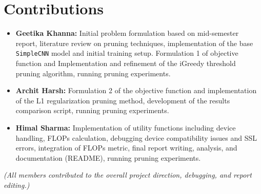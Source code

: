 \documentclass[conference]{IEEEtran} %
\begin{document}
\section*{Contributions}
\begin{itemize}
     \item \textbf{Geetika Khanna:} Initial problem formulation based on mid-semester report, literature review on pruning techniques, implementation of the base \texttt{SimpleCNN} model and initial training setup. Formulation 1 of objective function and Implementation and refinement of the iGreedy threshold pruning algorithm, running pruning experiments.
     \item \textbf{Archit Harsh:}  Formulation 2 of the objective function and implementation of the L1 regularization pruning method, development of the results comparison script, running pruning experiments.
     \item \textbf{Himal Sharma:} Implementation of utility functions including device handling, FLOPs calculation, debugging device compatibility issues and SSL errors, integration of FLOPs metric, final report writing, analysis, and documentation (README), running pruning experiments.
\end{itemize}
\textit{(All members contributed to the overall project direction, debugging, and report editing.)}
\end{document}
